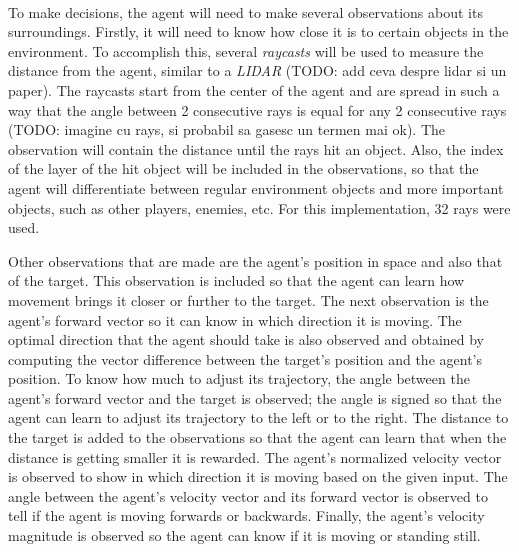 \paragraph{}
To make decisions, the agent will need to make several observations about its surroundings. Firstly, it will need to know how close it is to certain objects in the environment. To accomplish this, several \emph{raycasts} will be used to measure the distance from the agent, similar to a \emph{LIDAR} (TODO: add ceva despre lidar si un paper). The raycasts start from the center of the agent and are spread in such a way that the angle between 2 consecutive rays is equal for any 2 consecutive rays (TODO: imagine cu rays, si probabil sa gasesc un termen mai ok). The observation will contain the distance until the rays hit an object. Also, the index of the layer of the hit object will be included in the observations, so that the agent will differentiate between regular environment objects and more important objects, such as other players, enemies, etc. For this implementation, 32 rays were used.

Other observations that are made are the agent's position in space and also that of the target. This observation is included so that the agent can learn how movement brings it closer or further to the target. The next observation is the agent's forward vector so it can know in which direction it is moving. The optimal direction that the agent should take is also observed and obtained by computing the vector difference between the target's position and the agent's position. To know how much to adjust its trajectory, the angle between the agent's forward vector and the target is observed; the angle is signed so that the agent can learn to adjust its trajectory to the left or to the right. The distance to the target is added to the observations so that the agent can learn that when the distance is getting smaller it is rewarded. The agent's normalized velocity vector is observed to show in which direction it is moving based on the given input. The angle between the agent's velocity vector and its forward vector is observed to tell if the agent is moving forwards or backwards. Finally, the agent's velocity magnitude is observed so the agent can know if it is moving or standing still. 

